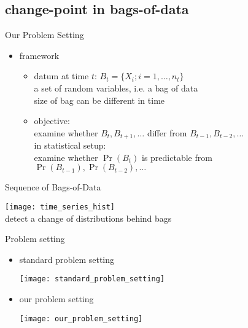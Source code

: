 \documentclass[fleqn,aspectratio=1610]{beamer}
\begin{document}
\subsection{change-point in bags-of-data}
\label{sec:orgff26bea}
\begin{frame}[label={sec:org224b13b}]{Our Problem Setting}
\begin{itemize}
\item framework
\begin{itemize}
\item datum at time \(t\): \(B_t=\{X_i;i=1,\dotsc,n_t\}\) \\[0pt]
a set of random variables, i.e. a bag of data\\[0pt]
\alert{size of bag can be different in time}
\item objective: \\[0pt]
examine whether \(B_t,B_{t+1},\dotsc\) differ from 
\(B_{t-1},B_{t-2},\dotsc\) \\[4pt]
in statistical setup:\\[0pt]
\alert{examine whether \(\Pr(B_t)\) is predictable from \(\Pr(B_{t-1}),\Pr(B_{t-2}),\dotsc\)}

\nocite{KoshijimaHinoMurata2015}
\end{itemize}
\end{itemize}
\end{frame}

\begin{frame}[label={sec:orgd0608a6}]{Sequence of Bags-of-Data}
\begin{center}
\texttt{[image: time\_series\_hist]}\\[0pt]
detect a change of distributions behind bags
\end{center}
\end{frame}

\begin{frame}[label={sec:org4a51d09}]{Problem setting}
\begin{itemize}
\item standard problem setting
\begin{center}
\texttt{[image: standard\_problem\_setting]}
\end{center}
\item \alert{our problem setting}
\begin{center}
\texttt{[image: our\_problem\_setting]}
\end{center}
\end{itemize}
\end{frame}
\end{document}
